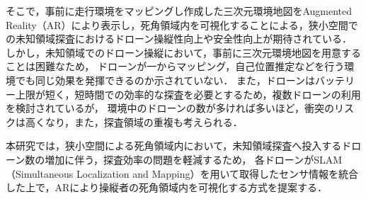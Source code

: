 \documentclass[a4paper,10pt,twocolumn,uplatex]{jsarticle}
\begin{document}
\par
そこで，事前に走行環境をマッピングし作成した三次元環境地図をAugmented Reality（AR）により表示し，死角領域内を可視化することによる，狭小空間での未知領域探査におけるドローン操縦性向上や安全性向上が期待されている\cite{Erat}．
しかし，未知領域でのドローン操縦において，事前に三次元環境地図を用意することは困難なため，
ドローンが一からマッピング，自己位置推定などを行う環境でも同じ効果を発揮できるのか示されていない．
また，ドローンはバッテリー上限が短く，短時間での効率的な探査を必要とするため\cite{Gupta}，複数ドローンの利用を検討されているが，
環境中のドローンの数が多ければ多いほど，衝突のリスクは高くなり，また，探査領域の重複も考えられる．

本研究では，狭小空間による死角領域内において，未知領域探査へ投入するドローン数の増加に伴う，探査効率の問題を軽減するため，
各ドローンがSLAM（Simultaneous Localization and Mapping）を用いて取得したセンサ情報を統合した上で，ARにより操縦者の死角領域内を可視化する方式を提案する．

\end{document}
